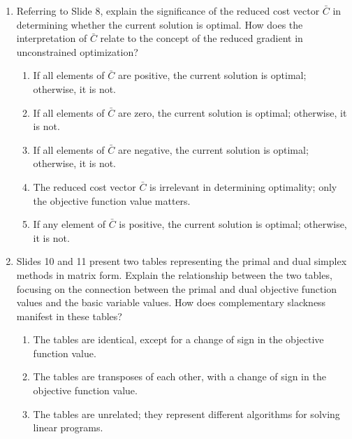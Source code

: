 \documentclass{article}%
\begin{document}
\begin{enumerate}
\begin{enumerate}
\begin{enumerate}
\item The initial basic feasible solution cannot be determined without performing at least one simplex iteration.%
\item The initial basic feasible solution is $x_1 = 5, x_2 = 0, w_1 = 17, w_2 = 3, w_3 = 0$, and $\zeta = 15$.%
\item The initial basic feasible solution is $x_1 = 0, x_2 = 4, w_1 = 0, w_2 = 4, w_3 = 6$, and $\zeta = 8$.%
\end{enumerate}%
\vspace{0.5em}%
\item Referring to Slide 8, explain the significance of the reduced cost vector $\bar{C}$ in determining whether the current solution is optimal.  How does the interpretation of $\bar{C}$ relate to the concept of the reduced gradient in unconstrained optimization?%
\begin{enumerate}%
\item If all elements of $\bar{C}$ are positive, the current solution is optimal; otherwise, it is not.%
\item If all elements of $\bar{C}$ are zero, the current solution is optimal; otherwise, it is not.%
\item If all elements of $\bar{C}$ are negative, the current solution is optimal; otherwise, it is not.%
\item The reduced cost vector $\bar{C}$ is irrelevant in determining optimality; only the objective function value matters.%
\item If any element of $\bar{C}$ is positive, the current solution is optimal; otherwise, it is not.%
\end{enumerate}%
\vspace{0.5em}%
\item Slides 10 and 11 present two tables representing the primal and dual simplex methods in matrix form. Explain the relationship between the two tables, focusing on the connection between the primal and dual objective function values and the basic variable values.  How does complementary slackness manifest in these tables?%
\begin{enumerate}%
\item The tables are identical, except for a change of sign in the objective function value.%
\item The tables are transposes of each other, with a change of sign in the objective function value.%
\item The tables are unrelated; they represent different algorithms for solving linear programs.%

\end{enumerate}
\end{enumerate}
\end{enumerate}
\end{document}
